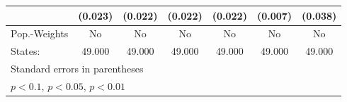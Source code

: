 {\begin{tabular}{l*{6}{c}}
            &     (0.023)         &     (0.022)         &     (0.022)         &     (0.022)         &     (0.007)         &     (0.038)         \\
\hline
Pop.-Weights&          No         &          No         &          No         &          No         &          No         &          No         \\
States:     &      49.000         &      49.000         &      49.000         &      49.000         &      49.000         &      49.000         \\
\hline\hline
\multicolumn{7}{l}{\footnotesize Standard errors in parentheses}\\
\multicolumn{7}{l}{\footnotesize \sym{*} \(p<0.1\), \sym{**} \(p<0.05\), \sym{***} \(p<0.01\)}\\
\end{tabular}
}
